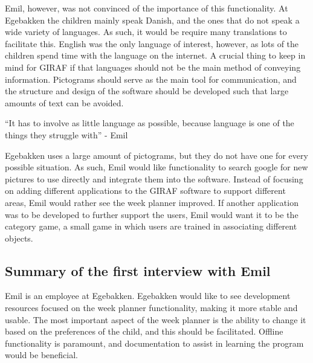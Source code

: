 Emil, however, was not convinced of the importance of this functionality.
At Egebakken the children mainly speak Danish, and the ones that do not speak a wide variety of languages. 
As such, it would be require many translations to facilitate this.
English was the only language of interest, however, as lots of the children spend time with the language on the internet.
A crucial thing to keep in mind for GIRAF if that languages should not be the main method of conveying information. 
Pictograms should serve as the main tool for communication, and the structure and design of the software should be developed such that large amounts of text can be avoided.
\begin{displayquote}
    ``It has to involve as little language as possible, because language is one of the things they struggle with'' - Emil
\end{displayquote}
Egebakken uses a large amount of pictograms, but they do not have one for every possible situation.
As such, Emil would like functionality to search google for new pictures to use directly and integrate them into the software.
Instead of focusing on adding different applications to the GIRAF software to support different areas, Emil would rather see the week planner improved.
If another application was to be developed to further support the users, Emil would want it to be the category game, a small game in which users are trained in associating different objects.

\subsection{Summary of the first interview with Emil}
Emil is an employee at Egebakken.
Egebakken would like to see development resources focused on the week planner functionality, making it more stable and usable.
The most important aspect of the week planner is the ability to change it based on the preferences of the child, and this should be facilitated.
Offline functionality is paramount, and documentation to assist in learning the program would be beneficial.




